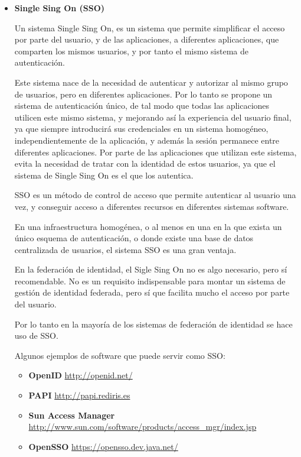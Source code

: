             \begin{itemize}

            \item \textbf{Single Sing On (SSO)}

    Un sistema Single Sing On, es un sistema que permite simplificar
    el acceso por parte del usuario, y de las aplicaciones, a
    diferentes aplicaciones, que comparten los mismos usuarios, y por
    tanto el mismo sistema de autenticación.

    Este sistema nace de la necesidad de autenticar y autorizar al
    mismo grupo de usuarios, pero en diferentes aplicaciones. Por lo
    tanto se propone un sistema de autenticación único, de tal modo
    que todas las aplicaciones utilicen este mismo sistema, y
    mejorando así la experiencia del usuario final, ya que siempre
    introducirá sus credenciales en un sistema homogéneo,
    independientemente de la aplicación, y además la sesión permanece
    entre diferentes aplicaciones. Por parte de las aplicaciones que
    utilizan este sistema, evita la necesidad de tratar con la
    identidad de estos usuarios, ya que el sistema de Single Sing On
    es el que los autentica.

    SSO es un método de control de acceso que permite autenticar al
    usuario una vez, y conseguir acceso a diferentes recursos en
    diferentes sistemas software.

    En una infraestructura homogénea, o al menos en una en la que
    exista un único esquema de autenticación, o donde existe una base
    de datos centralizada de usuarios, el sistema SSO es una gran
    ventaja.

    En la federación de identidad, el Sigle Sing On no es algo
    necesario, pero sí recomendable. No es un requisito indispensable
    para montar un sistema de gestión de identidad federada, pero sí
    que facilita mucho el acceso por parte del usuario.

    Por lo tanto en la mayoría de los sistemas de federación de
    identidad se hace uso de SSO.

    Algunos ejemplos de software que puede servir como SSO:
    \begin{itemize}
        \item \textbf{OpenID} \href{http://openid.net/}{http://openid.net/}
        \item \textbf{PAPI}
        \href{http://papi.rediris.es}{http://papi.rediris.es}
        \item \textbf{Sun Access Manager}
        \href{http://www.sun.com/software/products/access_mgr/index.jsp}{http://www.sun.com/software/products/access\_mgr/index.jsp}
        \item \textbf{OpenSSO}
        \href{https://opensso.dev.java.net/}{https://opensso.dev.java.net/}
    \end{itemize}


\end{itemize}
